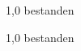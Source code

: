 \documentclass[ngerman,12pt]{scrartcl}
\begin{document}
{1,0}
{bestanden}



{1,0}
{bestanden}
\end{document}
